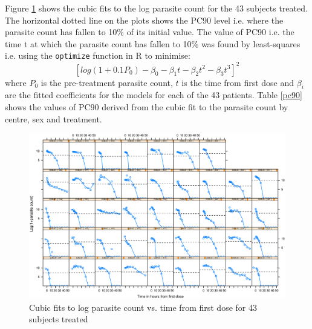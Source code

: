 Figure \ref{cubics} shows the cubic fits to the log parasite count for the 43 subjects treated. The horizontal dotted line on the plots shows the PC90 level i.e. where the parasite count has fallen to 10\% of its initial value. The value of PC90 i.e. the time t at which the parasite count has fallen to 10\% was found by least-squares i.e. using the \texttt{optimize} function in R to minimise:
$$[log(1+0.1P_0)-\beta_0-\beta_1t-\beta_2t^2-\beta_3t^3]^2$$
where $P_0$ is the pre-treatment parasite count, $t$ is the time from first dose and $\beta_i$ are the fitted coefficients for the models for each of the 43 patients. Table \ref{pc90} shows the values of PC90 derived from the cubic fit to the parasite count by centre, sex and treatment.
\begin{figure}
\includegraphics[scale=0.8]{cubics.eps} 
\caption{Cubic fits to log parasite count vs. time from first dose for 43 subjects treated}\label{cubics}
\end{figure}
